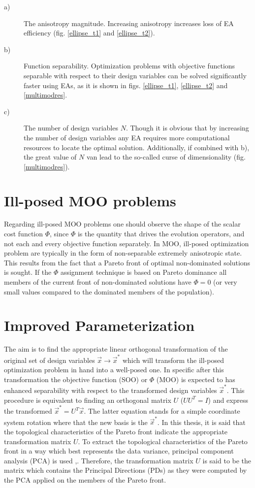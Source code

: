 \begin{description}
  \item[a)] The anisotropy magnitude. Increasing anisotropy increases loss of EA efficiency (fig. \ref{ellipse_t1} and \ref{ellipse_t2}).    
  \item[b)] Function separability. Optimization problems with objective functions separable with respect to their design variables can be solved significantly faster using EAs, as it is shown in figs. \ref{ellipse_t1}, \ref{ellipse_t2} and \ref{multimodres}.  
  \item[c)] The number of design variables $N$. Though it is obvious that by increasing the number of design variables any EA requires more computational resources to locate the optimal solution. Additionally, if combined with b), the great value of $N$ van lead to the so-called curse of dimensionality (fig. \ref{multimodres}).  
\end{description}

\section{Ill-posed MOO problems}
\label{VCMM}
Regarding ill-posed MOO problems one should observe the shape of the scalar cost function $\Phi$, since $\Phi$ is the quantity that drives the evolution operators, and not each and every objective function separately. In MOO, ill-posed optimization problem are typically in the form of non-separable extremely anisotropic state. This results from the fact that a Pareto front of optimal non-dominated solutions is sought. If the $\Phi$ assignment technique is based on Pareto dominance all members of the current front of non-dominated solutions have $\Phi=0$ (or very small values compared to the dominated members of the population).

\section{Improved Parameterization}
The aim is to find the appropriate linear orthogonal transformation of the original set of design variables $\vec{x}  \rightarrow \vec{x}^*$ which will transform the ill-posed optimization problem in hand into a well-posed one. In specific after this transformation the objective function (SOO) or $\Phi$ (MOO) is expected to has enhanced separability with respect to the transformed design variables $\vec{x}^*$.  This procedure is equivalent to finding an orthogonal matrix $U$ ($UU^T=I$) and express the transformed $\vec{x}^*=U^T\vec{x}$. The latter equation stands for a simple coordinate system rotation where that the new basis is the $\vec{x}^*$. In this thesis, it is said that the topological characteristics of the Pareto front indicate the appropriate transformation matrix $U$.  To extract the topological characteristics of the Pareto front in a way which best represents the data variance, principal component analysis (PCA) is used ,\cite{Hayk1999,Jolliffe_2002}. Therefore, the transformation matrix $U$ is said to be the matrix which contains the Principal Directions (PDs) as they were computed by the PCA applied on the members of the Pareto front.   

